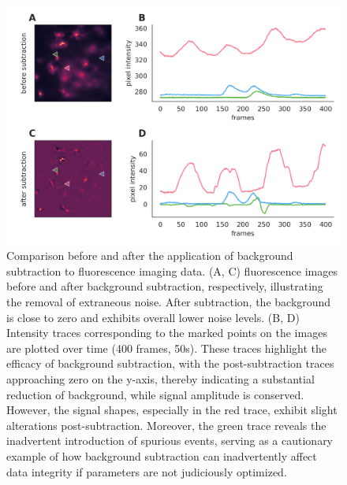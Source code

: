 \documentclass[utf8]{FrontiersinHarvard}
\begin{document}
    \begin{figure}[!htb]
        \begin{center}
            \includegraphics[width=\linewidth]{figures/4.png}
        \end{center}
        \caption{
            Comparison before and after the application of background subtraction to fluorescence imaging data. (A, C) fluorescence images before and after background subtraction, respectively, illustrating the removal of extraneous noise. After subtraction, the background is close to zero and exhibits overall lower noise levels. (B, D) Intensity traces corresponding to the marked points on the images are plotted over time (400 frames, 50s). These traces highlight the efficacy of background subtraction, with the post-subtraction traces approaching zero on the y-axis, thereby indicating a substantial reduction of background, while signal amplitude is conserved. However, the signal shapes, especially in the red trace, exhibit slight alterations post-subtraction. Moreover, the green trace reveals the inadvertent introduction of spurious events, serving as a cautionary example of how background subtraction can inadvertently affect data integrity if parameters are not judiciously optimized.
        }\label{fig:4}
    \end{figure}
\end{document}
